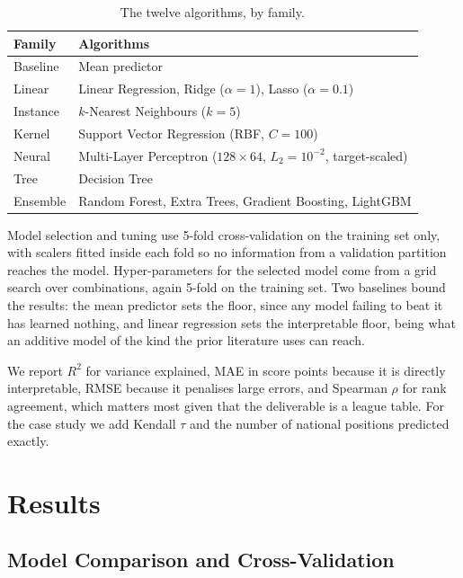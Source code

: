 \documentclass[11pt,a4paper]{article}
\begin{document}
\begin{table}[H]\centering\small
\caption{The twelve algorithms, by family.}
\begin{tabular}{lp{9.2cm}}
\toprule
\textbf{Family} & \textbf{Algorithms} \\
\midrule
Baseline   & Mean predictor \\
Linear     & Linear Regression, Ridge ($\alpha=1$), Lasso ($\alpha=0.1$) \\
Instance   & $k$-Nearest Neighbours ($k=5$) \\
Kernel     & Support Vector Regression (RBF, $C=100$) \\
Neural     & Multi-Layer Perceptron ($128\times64$, $L_2 = 10^{-2}$, target-scaled) \\
Tree       & Decision Tree \\
Ensemble   & Random Forest, Extra Trees, Gradient Boosting, LightGBM \\
\bottomrule
\end{tabular}
\end{table}

\noindent Model selection and tuning use 5-fold cross-validation on the training set only, with
scalers fitted inside each fold so no information from a validation partition reaches the model.
Hyper-parameters for the selected model come from a grid search over \nGrid{} combinations, again
5-fold on the training set. Two baselines bound the results: the mean predictor sets the floor, since
any model failing to beat it has learned nothing, and linear regression sets the interpretable floor,
being what an additive model of the kind the prior literature uses can reach.

We report $R^2$ for variance explained, MAE in score points because it is directly interpretable,
RMSE because it penalises large errors, and Spearman $\rho$ for rank agreement, which matters most
given that the deliverable is a league table. For the case study we add Kendall $\tau$ and the number
of national positions predicted exactly.

\section{Results}
\label{sec:results}

\subsection{Model Comparison and Cross-Validation}
\end{document}
